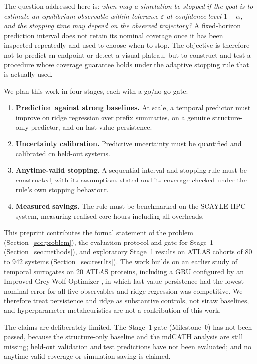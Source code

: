 \documentclass[11pt]{article}
\begin{document}
The question addressed here is: \emph{when may a simulation be stopped if the goal is to estimate an equilibrium observable within tolerance $\varepsilon$ at confidence level $1-\alpha$, and the stopping time may depend on the observed trajectory?} A fixed-horizon prediction interval does not retain its nominal coverage once it has been inspected repeatedly and used to choose when to stop. The objective is therefore not to predict an endpoint or detect a visual plateau, but to construct and test a procedure whose coverage guarantee holds under the adaptive stopping rule that is actually used.

We plan this work in four stages, each with a go/no-go gate:
\begin{enumerate}
\item \textbf{Prediction against strong baselines.} At scale, a temporal predictor must improve on ridge regression over prefix summaries, on a genuine structure-only predictor, and on last-value persistence.
\item \textbf{Uncertainty calibration.} Predictive uncertainty must be quantified and calibrated on held-out systems.
\item \textbf{Anytime-valid stopping.} A sequential interval and stopping rule must be constructed, with its assumptions stated and its coverage checked under the rule's own stopping behaviour.
\item \textbf{Measured savings.} The rule must be benchmarked on the SCAYLE HPC system, measuring realised core-hours including all overheads.
\end{enumerate}

This preprint contributes the formal statement of the problem (Section~\ref{sec:problem}), the evaluation protocol and gate for Stage~1 (Section~\ref{sec:methods}), and exploratory Stage~1 results on ATLAS cohorts of 80 to 942 systems (Section~\ref{sec:results}). The work builds on an earlier study of temporal surrogates on 20 ATLAS proteins, including a GRU configured by an Improved Grey Wolf Optimizer \cite{HernandoGallego2026Mathematics}, in which last-value persistence had the lowest nominal error for all five observables and ridge regression was competitive. We therefore treat persistence and ridge as substantive controls, not straw baselines, and hyperparameter metaheuristics are not a contribution of this work.

The claims are deliberately limited. The Stage~1 gate (Milestone~0) has not been passed, because the structure-only baseline and the mdCATH analysis are still missing; held-out validation and test predictions have not been evaluated; and no anytime-valid coverage or simulation saving is claimed.
\end{document}
